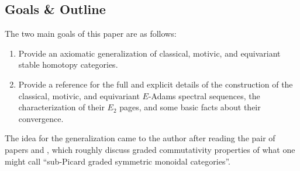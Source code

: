 \documentclass[../main.tex]{subfiles}
\begin{document}
\subsection{Goals \& Outline}

The two main goals of this paper are as follows:
\begin{enumerate}
    \item Provide an axiomatic generalization of classical, motivic, and equivariant stable homotopy categories.
    \item Provide a reference for the full and explicit details of the construction of the classical, motivic, and equivariant $E$-Adams spectral sequences, the characterization of their $E_2$ pages, and some basic facts about their convergence.
\end{enumerate}
The idea for the generalization came to the author after reading the pair of papers \cite{Dugger_2014} and \cite{DDIO}, which roughly discuss graded commutativity properties of what one might call ``sub-Picard graded symmetric monoidal categories''.
\end{document}
